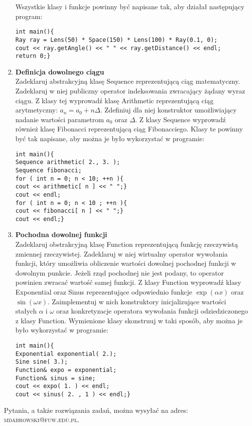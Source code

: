 \documentclass[12pt]{article}
\begin{document}
\begin{enumerate}
Wszystkie klasy i funkcje powinny być napisane tak, aby działał następujący program:
\begin{verbatim}
int main(){
Ray ray = Lens(50) * Space(150) * Lens(100) * Ray(0.1, 0);
cout << ray.getAngle() << " " << ray.getDistance() << endl;
return 0;}
\end{verbatim}

\newpage
{}

\item \textbf{Definicja dowolnego ciągu}\\
Zadeklaruj abstrakcyjną klasę \textsf{Sequence} reprezentującą ciąg matematyczny. Zadeklaruj w niej publiczny operator indeksowania zwracający żądany wyraz ciągu. Z klasy tej wyprowadź klasę \textsf{Arithmetic} reprezentującą ciąg arytmetyczny: $a_n=a_0+n\Delta$. Zdefiniuj dla niej konstruktor umożliwiający nadanie wartości parametrom $a_0$ oraz $\Delta$. Z klasy \textsf{Sequence} wyprowadź również klasę \textsf{Fibonacci} reprezentującą ciąg Fibonacciego. Klasy te powinny być tak napisane, aby można je było wykorzystać w programie:
\begin{verbatim}
int main(){
Sequence arithmetic( 2., 3. );
Sequence fibonacci;
for ( int n = 0; n < 10; ++n ){
cout << arithmetic[ n ] << " ";}
cout << endl;
for ( int n = 0; n < 10 ; ++n ){
cout << fibonacci[ n ] << " ";}
cout << endl;}
\end{verbatim}

\item \textbf{Pochodna dowolnej funkcji}\\
Zadeklaruj obstrakcyjną klasę \textsf{Function} reprezentującą funkcję rzeczywistą zmiennej rzeczywistej. Zadeklaruj w niej wirtualny operator wywołania funkcji, który umożliwia obliczenie wartości dowolnej pochodnej funkcji w dowolnym punkcie. Jeżeli rząd pochodnej nie jest podany, to operator powinien zwracać wartość samej funkcji. Z klasy \textsf{Function} wyprowadź klasy \textsf{Exponential} oraz \textsf{Sinus} reprezentujące odpowiednio funkcje $\exp{(\alpha x)}$ oraz $\sin{(\omega x)}$. Zaimplementuj w nich konstruktory inicjalizujące wartości stałych $\alpha$ i $\omega$ oraz konkretyzacje operatora wywołania funkcji odziedziczonego z klasy \textsf{Function}. Wymienione klasy skonstruuj w taki sposób, aby można je było wykorzystać w programie:
\begin{verbatim}
int main(){
Exponential exponential( 2.);
Sine sine( 3.);
Function& expo = exponential;
Function& sinus = sine;
cout << expo( 1. ) << endl;
cout << sinus( 2. , 1 ) << endl;}
\end{verbatim}

\end{enumerate}
\vspace{1cm}
\small Pytania, a także rozwiązania zadań, można wysyłać na adres: \textsc{mdabrowski@fuw.edu.pl}.
\end{document}
